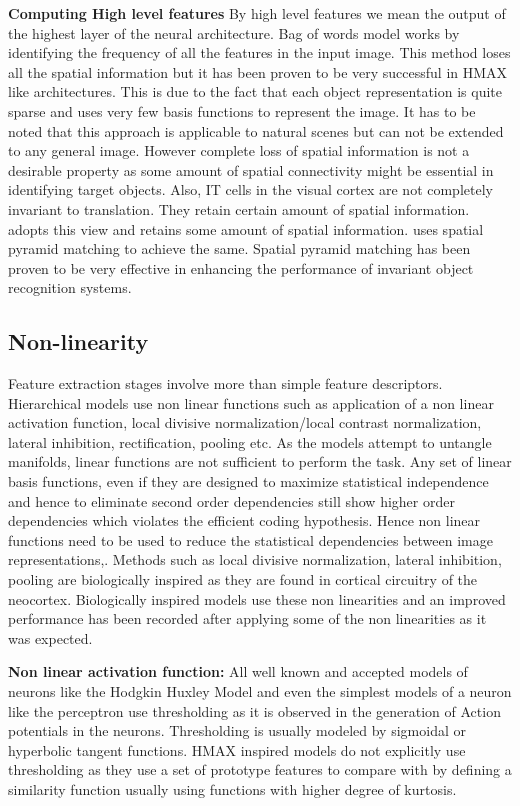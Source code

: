 \documentclass[12pt,twoside]{article}
\theoremstyle{plain}
\theoremstyle{definition}
\theoremstyle{remark}
\begin{document}
\textbf{Computing High level features}
By high level features we mean the output of the highest layer of the neural architecture. Bag of words model works by identifying the frequency of all the features in the input image. This method loses all the spatial information but it has been proven to be very successful in HMAX like architectures. This is due to the fact that each object representation is quite sparse and uses very few basis functions to represent the image. It has to be noted that this approach is applicable to natural scenes but can not be extended to any general image. However complete loss of spatial information is not a desirable property as some amount of spatial connectivity might be essential in identifying target objects. Also, IT cells in the visual cortex are not completely invariant to translation. They retain certain amount of spatial information. \cite{JimMutch2008} adopts this view and retains some amount of spatial information. \cite{XiaolinHu2014} uses spatial pyramid matching to achieve the same. Spatial pyramid matching has been proven to be very effective in enhancing the performance of invariant object recognition systems.
\subsection{Non-linearity}
\label{Subsec: Nonlinear} Feature extraction stages involve more than simple feature descriptors. Hierarchical models use non linear functions such as application of a non linear activation function, local divisive normalization/local contrast normalization, lateral inhibition, rectification, pooling etc. As the models attempt to untangle manifolds, linear functions are not sufficient to perform the task. Any set of linear basis functions, even if they are designed to maximize statistical independence and hence to eliminate second order dependencies still show higher order dependencies\cite{EeroP.Simoncelli1999} which violates the efficient coding hypothesis. Hence non linear functions need to be used to reduce the statistical dependencies between image representations\cite{Bethge2006},. Methods such as local divisive normalization, lateral inhibition, pooling are biologically inspired as they are found in cortical circuitry of the neocortex. Biologically inspired models use these non linearities and an improved performance has been recorded after applying some of the non linearities as it was expected.

\textbf{Non linear activation function: }All well known and accepted models of neurons like the Hodgkin Huxley Model\cite{Hodgkin1952} and even the simplest models of a neuron like the perceptron\cite{Rosenblatt1957} use thresholding as it is observed in the generation of Action potentials in the neurons. Thresholding is usually modeled by sigmoidal or hyperbolic tangent functions. HMAX inspired models do not explicitly use thresholding as they use a set of prototype features to compare with by defining a similarity function usually using functions with higher degree of kurtosis.
\end{document}
